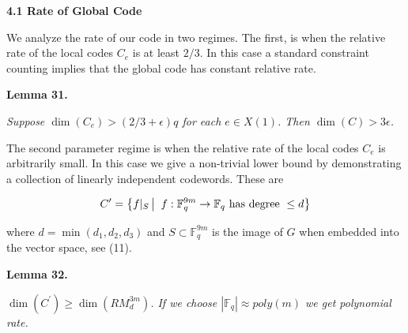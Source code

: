 \par\medskip\noindent\textbf{
4.1 Rate of Global Code}\par




We analyze the rate of our code in two regimes. The first, is when the relative rate of the local codes $C_{e}$ is at least $2/3$. In this case a standard constraint counting implies that the global code has constant relative rate.\par





\par\medskip\noindent\textbf{
\textbf{Lemma 31}\textbf{.}
}\par



\emph{Suppose $\dim(C_{e})>(2/3+\epsilon)q$ for each $e\in X(1)$. Then $\dim(C)>3\epsilon$.}\par






The second parameter regime is when the relative rate of the local codes $C_{e}$ is arbitrarily small. In this case we give a non-trivial lower bound by demonstrating a collection of linearly independent codewords. These are\par


\[\begin{gathered}
C^{\prime}=\left\{f|_{S}\left|\;\vphantom{f|_{S}f:\mathbb{F}_{q}^{9m}\to\mathbb{F}_{q}\hbox{ has degree }\leq d}\right.f:\mathbb{F}_{q}^{9m}\to\mathbb{F}_{q}\hbox{ has degree }\leq d\right\}
\end{gathered}\]


where $d=\min(d_{1},d_{2},d_{3})$ and $S\subset\mathbb{F}_{q}^{9m}$ is the image of $G$ when embedded into the vector space, see (11).\par





\par\medskip\noindent\textbf{
\textbf{Lemma 32}\textbf{.}
}\par



$\dim(C^{\prime})\geq\dim(RM_{d}^{3m})$\emph{. If we choose $|\mathbb{F}_{q}|\approx poly(m)$ we get polynomial rate.}\par



